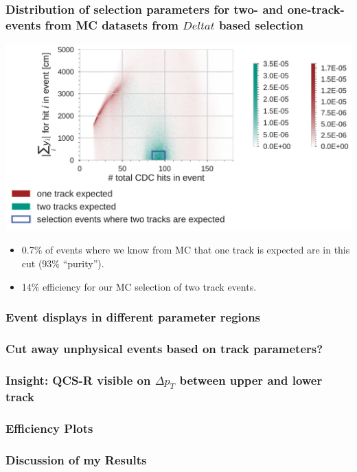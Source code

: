 \documentclass[18pt]{beamer}
\begin{document}
\begin{frame}
  \frametitle{Distribution of selection parameters for two- and one-track-events from MC datasets from $Delta t$ based selection}
  \begin{center}
    \includegraphics[width=1.0\textwidth]{figures/mcsplit_analysis/sum_y_vs_hits_merged.pdf}
  \end{center}
  \begin{itemize}
  \item 0.7\% of events where we know from MC that one track is expected are in this cut (93\% ``purity'').\\
  \item 14\% efficiency for our MC selection of two track events.
  \end{itemize}
\end{frame}

\begin{frame}
  \frametitle{Event displays in different parameter regions}
  
\end{frame}

\begin{frame}
  \frametitle{Cut away unphysical events based on track parameters?}
  
\end{frame}

\begin{frame}
  \frametitle{Insight: QCS-R visible on $\Delta p_T$ between upper and
    lower track}
  
\end{frame}

\begin{frame}
  \frametitle{Efficiency Plots}
  
\end{frame}

\begin{frame}
  \frametitle{Discussion of my Results}
  
\end{frame}
\end{document}
